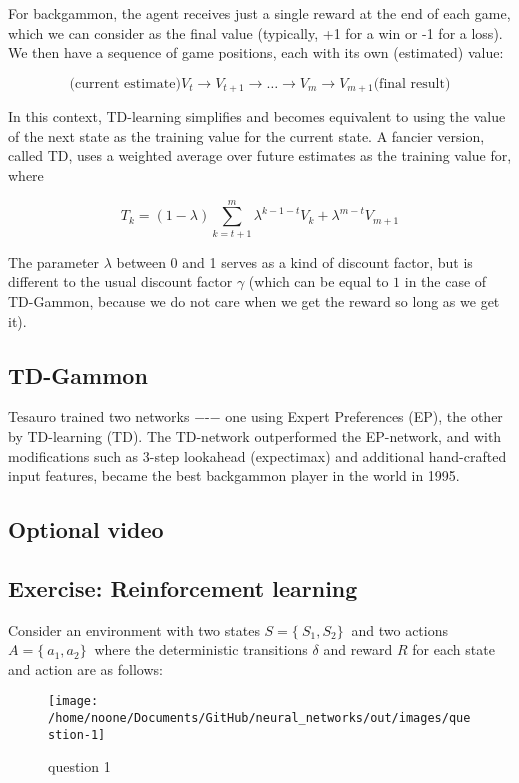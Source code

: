 \documentclass[11pt]{article}
\begin{document}
For backgammon, the agent receives just a single reward at the end of each
game, which we can consider as the final value  (typically, +1 for a win or -1
for a loss).
We then have a sequence of game positions, each with its own (estimated) value:

\[\text{(current estimate)} V_t \to V_{t+1} \to \dots \to V_m \to V_{m+1} \text{(final result)}\]

In this context, TD-learning simplifies and becomes equivalent to using the
value of the next state as the training value for the current state.
A fancier version, called TD, uses a weighted average over future estimates as
the training value for, where

\[T_k = (1 - \lambda) \sum_{k=t+1}^{m} \lambda^{k-1-t} V_k + \lambda^{m-t} V_{m+1}\]

The parameter $\lambda$ between 0 and 1 serves as a kind of discount factor,
but is different to the usual discount factor $\gamma$ (which can be equal to
$1$ in the case of TD-Gammon, because we do not care when we get the reward so
long as we get it).

\subsection{TD-Gammon}\label{subsec:td-gammon}
Tesauro trained two networks −-− one using Expert Preferences (EP), the other
by TD-learning (TD).
The TD-network outperformed the EP-network, and with modifications such as
3-step lookahead (expectimax) and additional hand-crafted input features,
became the best backgammon player in the world in 1995.

\subsection{Optional video}\label{subsec:optional-video8}

\subsection{Exercise: Reinforcement learning}\label{subsec:exercise:-reinforcement-learning}

Consider an environment with two states $S = \{\ S_1, S_2 \}\ $ and two actions
$A = \{\ a_1, a_2 \}\ $
where the deterministic transitions $\delta$ and reward $R$ for each state and
action are as follows:
\begin{figure}[h]
    \centering
    \texttt{[image: /home/noone/Documents/GitHub/neural\_networks/out/images/question-1]}
    \caption[question 1]{question 1}
    \label{fig:question 1}
\end{figure}
\end{document}

